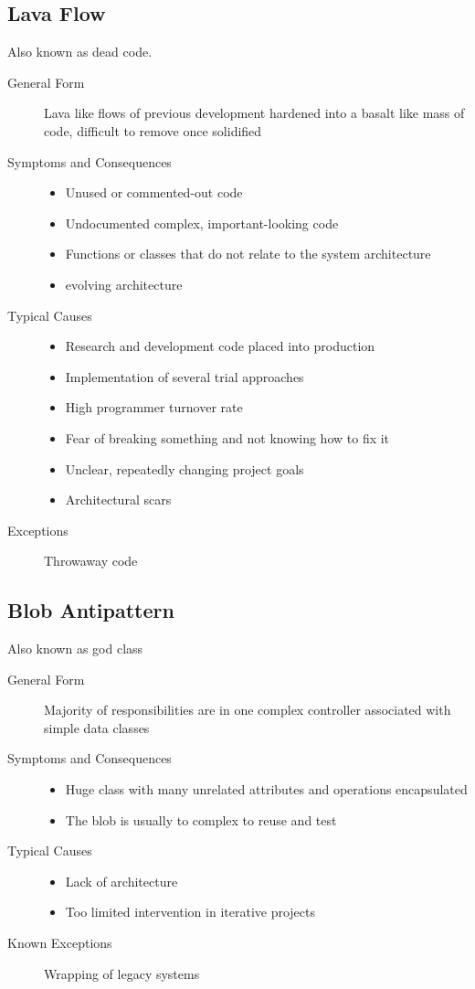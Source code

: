\subsection{Lava Flow}
Also known as dead code.
\begin{description}
  \item[General Form] Lava like flows of previous development hardened into a basalt like mass of code, difficult to remove once solidified
  \item[Symptoms and Consequences] \hfill
  \begin{itemize}
    \item Unused or commented-out code
    \item Undocumented complex, important-looking code
    \item Functions or classes that do not relate to the system architecture
    \item evolving architecture
  \end{itemize}
  \item[Typical Causes] \hfill
  \begin{itemize}
    \item Research and development code placed into production
    \item Implementation of several trial approaches
    \item High programmer turnover rate
    \item Fear of breaking something and not knowing how to fix it
    \item Unclear, repeatedly changing project goals
    \item Architectural scars
  \end{itemize}
  \item[Exceptions] Throwaway code
\end{description}
\newpage

\subsection{Blob Antipattern}
Also known as god class
\begin{description}
  \item[General Form] Majority of responsibilities are in one complex controller associated with simple data classes
  \item[Symptoms and Consequences] \hfill
  \begin{itemize}
    \item Huge class with many unrelated attributes and operations encapsulated
    \item The blob is usually to complex to reuse and test
  \end{itemize}
  \item[Typical Causes] \hfill
  \begin{itemize}
    \item Lack of architecture
    \item Too limited intervention in iterative projects
  \end{itemize}
  \item[Known Exceptions] Wrapping of legacy systems
\end{description}
\newpage

